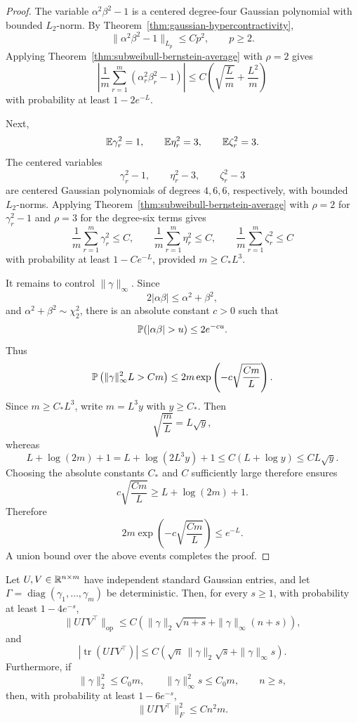 \begin{proof}
The variable \(\alpha^2\beta^2-1\) is a centered degree-four Gaussian polynomial
with bounded \(L_2\)-norm. By Theorem~\ref{thm:gaussian-hypercontractivity},
\[
\|\alpha^2\beta^2-1\|_{L_p}
\le
Cp^2,
\qquad p\ge2.
\]
Applying Theorem~\ref{thm:subweibull-bernstein-average} with \(\rho=2\) gives
\[
\left|
\frac1m\sum_{r=1}^m(\alpha_r^2\beta_r^2-1)
\right|
\le
C\left(\sqrt{\frac Lm}+\frac{L^2}{m}\right)
\]
with probability at least \(1-2e^{-L}\).

Next,
\[
\mathbb{E}\gamma_r^2=1,
\qquad
\mathbb{E}\eta_r^2=3,
\qquad
\mathbb{E}\zeta_r^2=3.
\]
The centered variables
\[
\gamma_r^2-1,
\qquad
\eta_r^2-3,
\qquad
\zeta_r^2-3
\]
are centered Gaussian polynomials of degrees \(4,6,6\), respectively, with bounded
\(L_2\)-norms. Applying Theorem~\ref{thm:subweibull-bernstein-average} with
\(\rho=2\) for \(\gamma_r^2-1\) and \(\rho=3\) for the degree-six terms gives
\[
\frac1m\sum_{r=1}^m\gamma_r^2\le C,
\qquad
\frac1m\sum_{r=1}^m\eta_r^2\le C,
\qquad
\frac1m\sum_{r=1}^m\zeta_r^2\le C
\]
with probability at least \(1-Ce^{-L}\), provided \(m\ge C_*L^3\).

It remains to control \(\|\gamma\|_\infty\). Since
\[
2|\alpha\beta|\le \alpha^2+\beta^2,
\]
and \(\alpha^2+\beta^2\sim\chi^2_2\), there is an absolute constant \(c>0\) such
that
\[
\Pbb(|\alpha\beta|>u)\le 2e^{-cu}.
\]
Thus
\[
\mathbb{P}\left(\|\gamma\|_\infty^2L>Cm\right)
\le
2m\exp\left(-c\sqrt{\frac{Cm}{L}}\right).
\]
Since \(m\ge C_*L^3\), write \(m=L^3y\) with \(y\ge C_*\). Then
\[
\sqrt{\frac{m}{L}}=L\sqrt y,
\]
whereas
\[
L+\log(2m)+1
=
L+\log(2L^3y)+1
\le
C(L+\log y)
\le
CL\sqrt y.
\]
Choosing the absolute constants \(C_*\) and \(C\) sufficiently large therefore ensures
\[
c\sqrt{\frac{Cm}{L}}
\ge
L+\log(2m)+1.
\]
Therefore
\[
2m\exp\left(-c\sqrt{\frac{Cm}{L}}\right)
\le e^{-L}.
\]
A union bound over the above events completes the proof.
\end{proof}

\begin{lemma}
\label{lem:weighted-gaussian-product}
Let \(U,V\in\mathbb{R}^{n\times m}\) have independent standard Gaussian entries, and let
\(\Gamma=\operatorname{diag}(\gamma_1,\dots,\gamma_m)\) be deterministic. Then,
for every \(s\ge1\), with probability at least \(1-4e^{-s}\),
\[
\|U\Gamma V^\top\|_{\mathrm{op}}
\le
C\left(
\|\gamma\|_2\sqrt{n+s}+\|\gamma\|_\infty(n+s)
\right),
\]
and
\[
\left|\operatorname{tr}(U\Gamma V^\top)\right|
\le
C\left(\sqrt n\,\|\gamma\|_2\sqrt s+\|\gamma\|_\infty s\right).
\]
Furthermore, if
\[
\|\gamma\|_2^2\le C_0m,
\qquad
\|\gamma\|_\infty^2s\le C_0m,
\qquad
n\ge s,
\]
then, with probability at least \(1-6e^{-s}\),
\[
\|U\Gamma V^\top\|_F^2\le Cn^2m.
\]
\end{lemma}

